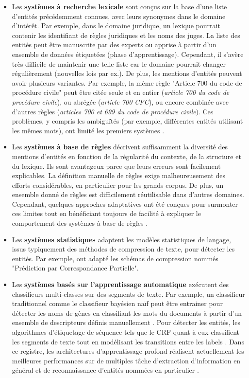\begin{itemize}
\item Les \textbf{systèmes à recherche lexicale} sont conçus sur la base d'une liste d'entités précédemment connues, avec leurs synonymes dans le domaine d'intérêt. Par exemple, dans le domaine juridique, un lexique pourrait contenir les identifiant de règles juridiques et les noms des juges. La liste des entités peut être manuscrite par des experts ou apprise à partir d'un ensemble de données étiquetées (phase d'apprentissage). Cependant, il s'avère très difficile de maintenir une telle liste car le domaine pourrait changer régulièrement (nouvelles lois par ex.). De plus, les mentions d'entités peuvent avoir plusieurs variantes. Par exemple, la même règle "Article 700 du code de procédure civile" peut \^etre citée seule et en entier (\textit{article 700 du code de procédure civile}), ou abrégée (\textit{article 700 CPC}), ou encore combinée avec d'autres règles (\textit{articles 700 et 699 du code de procédure civile}). Ces problèmes, y compris les ambiguïtés (par exemple, différentes entités utilisant les mêmes mots), ont limité les premiers systèmes \citep{palmer1997learnedLookup}.

\item Les \textbf{systèmes à base de règles} décrivent suffisamment la diversité des mentions d'entités en fonction de la régularité du contexte, de la structure et du lexique. Ils sont avantageux parce que leurs erreurs sont facilement explicables. La définition manuelle de règles exige malheureusement des efforts considérables, en particulier pour les grands corpus. De plus, un ensemble donné de règles est difficilement réutilisable dans d'autres domaines. Cependant, quelques approches adaptatives ont été conçues pour surmonter ces limites tout en bénéficiant toujours de facilité à expliquer le comportement des systèmes à base de règles \citep{siniakov2008gropusrulebased,chiticariu2010adaptativerulebased}.

\item Les \textbf{systèmes statistiques} adaptent les modèles statistiques de langage, issus typiquement des méthodes de compression de texte, pour détecter les entités. Par exemple, \citet{witten1999languagemodel} ont adapté les schémas de compression nommés "Prédiction par Correspondance Partielle".

\item Les \textbf{systèmes basés sur l'apprentissage automatique} exécutent des classifieurs multi-classes sur des segments de texte. Par exemple, un classifieur traditionnel comme le classifieur bayésien naïf peut être entrainer pour détecter les noms de gènes en classifiant les mots du documents à partir d'un ensemble de descripteurs définis manuellement \citep{persson2012nbbioner}. Pour détecter les entités, les algorithmes d'étiquetage de séquence tels que le CRF quant à eux classifient les segments de texte tout en modélisant les transitions entre les labels \citep{finkel2005stanfordcrfner}. Dans ce registre, les architectures d'apprentissage profond réalisent actuellement les meilleures performances sur de multiples tâche d'extraction d'information en général et de reconnaissance d'entités nommées en particulier \citep{lample2016nnner}.
\end{itemize}

